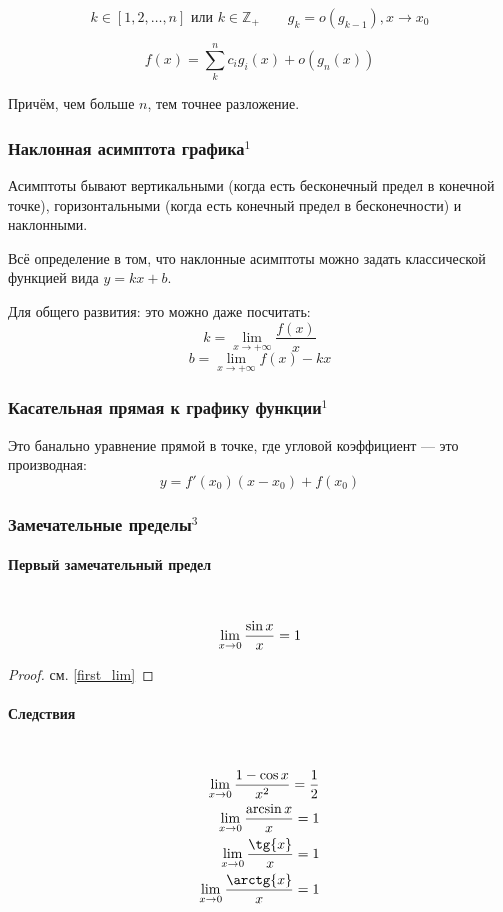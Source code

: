 \documentclass{article}
\let\vanillaparagraph\paragraph
\renewcommand{\paragraph}[1]{\vanillaparagraph{#1}\mbox{}\\}
\begin{document}
\[k \in [1, 2, \ldots, n] \text{ или } k \in \mathbb{Z}_+ \qquad g_k = o(g_{k - 1}), x \rightarrow x_0\]

\[f(x) = \sum_k^n{c_ig_i(x) + o(g_n(x))}\]

Причём, чем больше $n$, тем точнее разложение.

\subsubsection{Наклонная асимптота графика\texorpdfstring{$^1$}{}}
Асимптоты бывают вертикальными (когда есть бесконечный предел в конечной точке), горизонтальными (когда есть конечный предел в бесконечности) и наклонными.

Всё определение в том, что наклонные асимптоты можно задать классической функцией вида $y = kx + b$. 

Для общего развития: это можно даже посчитать: 
$$
k = \lim_{x\rightarrow +\infty} \frac{f(x)}{x}
$$
$$
b = \lim_{x\rightarrow +\infty} f(x) - kx
$$

\subsubsection{Касательная прямая к графику функции\texorpdfstring{$^1$}{}}
Это банально уравнение прямой в точке, где угловой коэффициент --- это производная:
$$
y = f'(x_0)(x - x_0) + f(x_0)
$$

\subsubsection{Замечательные пределы\texorpdfstring{$^3$}{}}
\paragraph{Первый замечательный предел}
\begin{equation}
\lim_{x\to 0} \frac{\sin{x}} {x} = 1 \notag
\end{equation}
\begin{proof}
см. \ref{first_lim}
\end{proof}
\paragraph{Следствия}
\begin{eqnarray}
\lim_{x\to 0} \frac{1 - \cos{x}} {x^2} = \frac{1}{2} \notag\\
\lim_{x\to 0} \frac{\arcsin{x}} {x} = 1 \notag \\
\lim_{x\to 0} \frac{\tg{x}} {x} = 1 \notag \\
\lim_{x\to 0} \frac{\arctg{x}} {x} = 1 \notag
\end{eqnarray}
\end{document}
